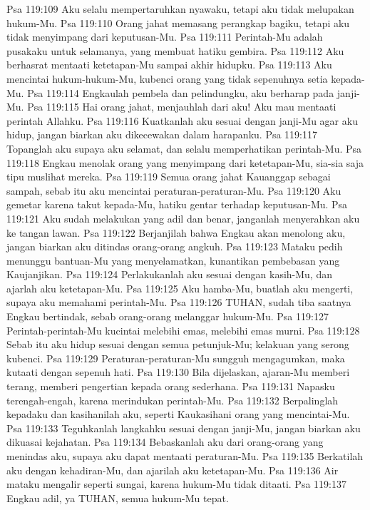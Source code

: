 Psa 119:109  Aku selalu mempertaruhkan nyawaku, tetapi aku tidak melupakan hukum-Mu.
Psa 119:110  Orang jahat memasang perangkap bagiku, tetapi aku tidak menyimpang dari keputusan-Mu.
Psa 119:111  Perintah-Mu adalah pusakaku untuk selamanya, yang membuat hatiku gembira.
Psa 119:112  Aku berhasrat mentaati ketetapan-Mu sampai akhir hidupku.
Psa 119:113  Aku mencintai hukum-hukum-Mu, kubenci orang yang tidak sepenuhnya setia kepada-Mu.
Psa 119:114  Engkaulah pembela dan pelindungku, aku berharap pada janji-Mu.
Psa 119:115  Hai orang jahat, menjauhlah dari aku! Aku mau mentaati perintah Allahku.
Psa 119:116  Kuatkanlah aku sesuai dengan janji-Mu agar aku hidup, jangan biarkan aku dikecewakan dalam harapanku.
Psa 119:117  Topanglah aku supaya aku selamat, dan selalu memperhatikan perintah-Mu.
Psa 119:118  Engkau menolak orang yang menyimpang dari ketetapan-Mu, sia-sia saja tipu muslihat mereka.
Psa 119:119  Semua orang jahat Kauanggap sebagai sampah, sebab itu aku mencintai peraturan-peraturan-Mu.
Psa 119:120  Aku gemetar karena takut kepada-Mu, hatiku gentar terhadap keputusan-Mu.
Psa 119:121  Aku sudah melakukan yang adil dan benar, janganlah menyerahkan aku ke tangan lawan.
Psa 119:122  Berjanjilah bahwa Engkau akan menolong aku, jangan biarkan aku ditindas orang-orang angkuh.
Psa 119:123  Mataku pedih menunggu bantuan-Mu yang menyelamatkan, kunantikan pembebasan yang Kaujanjikan.
Psa 119:124  Perlakukanlah aku sesuai dengan kasih-Mu, dan ajarlah aku ketetapan-Mu.
Psa 119:125  Aku hamba-Mu, buatlah aku mengerti, supaya aku memahami perintah-Mu.
Psa 119:126  TUHAN, sudah tiba saatnya Engkau bertindak, sebab orang-orang melanggar hukum-Mu.
Psa 119:127  Perintah-perintah-Mu kucintai melebihi emas, melebihi emas murni.
Psa 119:128  Sebab itu aku hidup sesuai dengan semua petunjuk-Mu; kelakuan yang serong kubenci.
Psa 119:129  Peraturan-peraturan-Mu sungguh mengagumkan, maka kutaati dengan sepenuh hati.
Psa 119:130  Bila dijelaskan, ajaran-Mu memberi terang, memberi pengertian kepada orang sederhana.
Psa 119:131  Napasku terengah-engah, karena merindukan perintah-Mu.
Psa 119:132  Berpalinglah kepadaku dan kasihanilah aku, seperti Kaukasihani orang yang mencintai-Mu.
Psa 119:133  Teguhkanlah langkahku sesuai dengan janji-Mu, jangan biarkan aku dikuasai kejahatan.
Psa 119:134  Bebaskanlah aku dari orang-orang yang menindas aku, supaya aku dapat mentaati peraturan-Mu.
Psa 119:135  Berkatilah aku dengan kehadiran-Mu, dan ajarilah aku ketetapan-Mu.
Psa 119:136  Air mataku mengalir seperti sungai, karena hukum-Mu tidak ditaati.
Psa 119:137  Engkau adil, ya TUHAN, semua hukum-Mu tepat.

